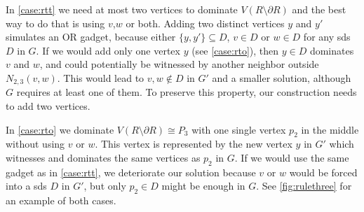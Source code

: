 In \cref{case:rtt} we need at most two vertices to dominate $V(R \setminus \partial R)$ and the best way to do that is using $v$,$w$ or both.
Adding two distinct vertices $y$ and $y'$ simulates an $\mathrm{OR}$ gadget, because either $\{y,y'\} \subseteq D$, $v \in D$ or $w \in D$ for any sds $D$ in $G$.
If we would add only one vertex $y$ (see \cref{case:rto}), then $y \in D$ dominates $v$ and $w$, and could potentially be witnessed by another neighbor outside $N_{2,3}(v,w)$.
This would lead to $v,w \notin D$ in $G'$ and a smaller solution, although $G$ requires at least one of them.
To preserve this property, our construction needs to add two vertices.

In \cref{case:rto} we dominate $V(R \setminus \partial R) \cong P_3$ with one single vertex $p_2$ in the middle without using $v$ or $w$.
This vertex is represented by the new vertex $y$ in $G'$ which witnesses and dominates the same vertices as $p_2$ in $G$.
If we would use the same gadget as in \cref{case:rtt}, we deteriorate our solution because  $v$ or $w$ would be forced into a sds $D$ in $G'$, but only $p_2 \in D$ might be enough in $G$.
See \cref{fig:rulethree} for an example of both cases.




